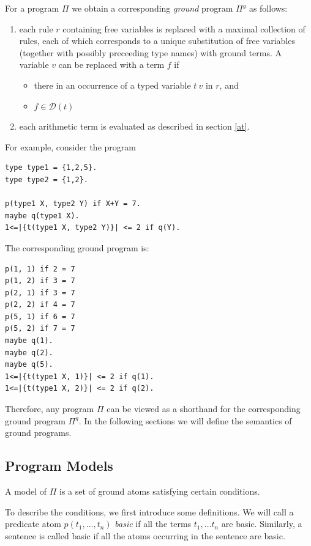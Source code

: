 \documentclass[a4paper,10pt]{article}
\begin{document}
For a program $\Pi$ we obtain a corresponding \textit{ground} program $\Pi^g$ as follows:
\begin{enumerate}
\item each rule $r$ containing free variables is replaced with a maximal collection of rules, each of which corresponds to a unique substitution 
of free variables (together with possibly preceeding type names)  with ground terms. A variable $v$ can be replaced with a term $f$ if
\begin{itemize}
\item there in an occurrence of a typed variable $t~v$ in $r$, and
\item  $f\in \mathcal{D}(t)$
\end{itemize}  
\item each arithmetic term is evaluated as described in section  \ref{at}.
\end{enumerate}

\medskip\noindent
For example, consider the program 
\begin{verbatim}
type type1 = {1,2,5}.
type type2 = {1,2}.

p(type1 X, type2 Y) if X+Y = 7.
maybe q(type1 X).
1<=|{t(type1 X, type2 Y)}| <= 2 if q(Y).
\end{verbatim}

\medskip\noindent
The corresponding ground program is:
\begin{verbatim}
p(1, 1) if 2 = 7
p(1, 2) if 3 = 7
p(2, 1) if 3 = 7
p(2, 2) if 4 = 7
p(5, 1) if 6 = 7
p(5, 2) if 7 = 7
maybe q(1).
maybe q(2).
maybe q(5).
1<=|{t(type1 X, 1)}| <= 2 if q(1).
1<=|{t(type1 X, 2)}| <= 2 if q(2).
\end{verbatim}

\medskip\noindent
Therefore, any program $\Pi$ can be viewed as a shorthand for the corresponding ground program $\Pi^g$.
In the following sections we will define the semantics of ground programs.


\subsection{Program Models}\label{rsat}
A model of $\Pi$ is a set of ground atoms satisfying certain conditions.

To describe the conditions,  we  first introduce some definitions.
 We will call a predicate atom $p(t_1,\ldots, t_n)$ \textit{basic} if all the terms $t_1,\ldots t_n$ are basic.
Similarly, a sentence is called basic if all the atoms occurring in the sentence are basic.
\end{document}

